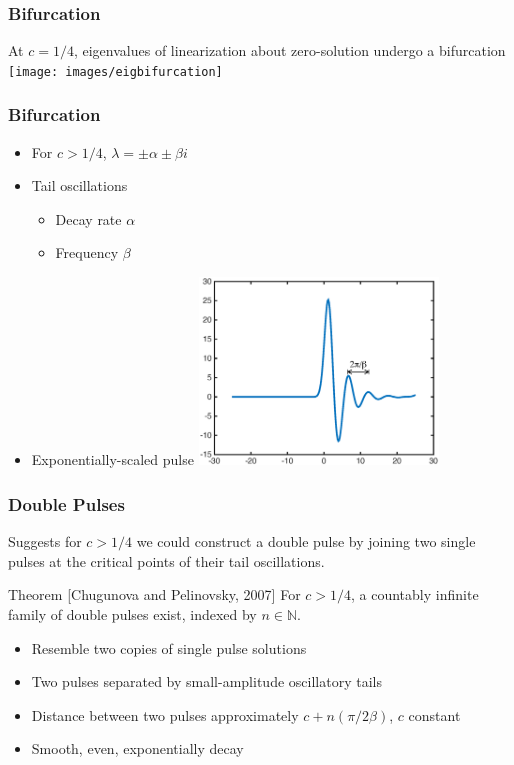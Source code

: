 \documentclass[16pt]{beamer}
\begin{document}
\begin{frame}
	\frametitle{Bifurcation}
	\fontsize{16}{7.2}\selectfont
	At $c = 1/4$, eigenvalues of linearization about zero-solution undergo a bifurcation
	\texttt{[image: images/eigbifurcation]}
\end{frame}

\begin{frame}
	\frametitle{Bifurcation}
	\fontsize{16}{7.2}\selectfont
	\begin{itemize}
		\item<1-> For $c > 1/4$, $\lambda = \pm \alpha \pm \beta i$
		\vspace{0.5cm}
		\item<2-> Tail oscillations
		\begin{itemize}
			\item Decay rate $\alpha$
			\item Frequency $\beta$
		\end{itemize}
		\vspace{0.5cm}
		\item<3-> Exponentially-scaled pulse
		\includegraphics[width=0.5\textwidth]{images/singlepulsemag}
	\end{itemize}
\end{frame}

\begin{frame}
	\frametitle{Double Pulses}
	\fontsize{16}{7.2}\selectfont
	Suggests for $c>1/4$ we could construct a double pulse by joining two single pulses at the critical points of their tail oscillations.

	\vspace{0.5cm}

	\begin{block}{Theorem \footnotesize [Chugunova and Pelinovsky, 2007]}
	For $c>1/4$, a countably infinite family of double pulses exist, indexed by $n \in \mathbb{N}$.
	\begin{itemize}
		\item Resemble two copies of single pulse solutions
		\item Two pulses separated by small-amplitude oscillatory tails
		\item Distance between two pulses approximately $c + n (\pi / 2 \beta)$, $c$ constant
		\item Smooth, even, exponentially decay
	\end{itemize}
	\end{block}

\end{frame}
\end{document}

